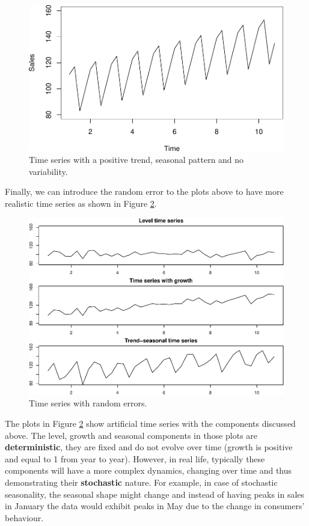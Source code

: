 \documentclass[
]{book}
\theoremstyle{definition}
\theoremstyle{definition}
\theoremstyle{definition}
\theoremstyle{definition}
\theoremstyle{remark}
\begin{document}
\begin{figure}
\centering
\includegraphics{adam_files/figure-latex/seasonalExample-1.pdf}
\caption{\label{fig:seasonalExample}Time series with a positive trend, seasonal pattern and no variability.}
\end{figure}

Finally, we can introduce the random error to the plots above to have more realistic time series as shown in Figure \ref{fig:allExample}.

\begin{figure}
\centering
\includegraphics{adam_files/figure-latex/allExample-1.pdf}
\caption{\label{fig:allExample}Time series with random errors.}
\end{figure}

The plots in Figure \ref{fig:allExample} show artificial time series with the components discussed above. The level, growth and seasonal components in those plots are \textbf{deterministic}, they are fixed and do not evolve over time (growth is positive and equal to 1 from year to year). However, in real life, typically these components will have a more complex dynamics, changing over time and thus demonstrating their \textbf{stochastic} nature. For example, in case of stochastic seasonality, the seasonal shape might change and instead of having peaks in sales in January the data would exhibit peaks in May due to the change in consumers' behaviour.
\end{document}
